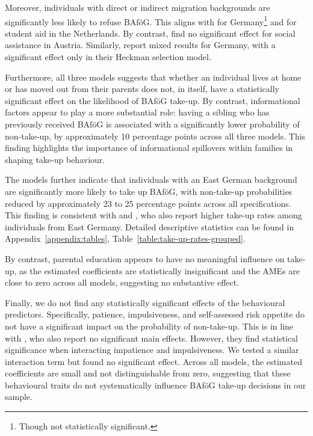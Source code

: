 Moreover, individuals with direct or indirect migration backgrounds are significantly less likely to refuse BAföG. 
This aligns with \cite{herber_non-take-up_2019} for Germany\footnote{Though not statistically significant.} and \cite{konijn_quantifying_2023} for student aid in the Netherlands. 
By contrast, \cite{fuchs_austria_2007} find no significant effect for social assistance in Austria. 
Similarly, \cite{frick_claim_2007} report mixed results for Germany, with a significant effect only in their Heckman selection model.

Furthermore, all three models suggests that whether an individual lives at home or has moved out from their parents does not, in itself, have a statistically significant effect on the likelihood of BAföG take-up. 
By contrast, informational factors appear to play a more substantial role: having a sibling who has previously received BAföG is associated with a significantly lower probability of non-take-up, by approximately 10 percentage points across all three models. 
This finding highlights the importance of informational spillovers within families in shaping take-up behaviour. 

The models further indicate that individuals with an East German background are significantly more likely to take up BAföG, with non-take-up probabilities reduced by approximately 23 to 25 percentage points across all specifications. 
This finding is consistent with \cite{herber_non-take-up_2019} and \cite{harnisch_nontakeup_2019}, who also report higher take-up rates among individuals from East Germany. 
Detailed descriptive statistics can be found in Appendix~\ref{appendix:tables}, Table~\ref{table:take-up-rates-grouped}.

By contrast, parental education appears to have no meaningful influence on take-up, as the estimated coefficients are statistically insignificant and the AMEs are close to zero across all models, suggesting no substantive effect.

Finally, we do not find any statistically significant effects of the behavioural predictors. 
Specifically, patience, impulsiveness, and self-assessed risk appetite do not have a significant impact on the probability of non-take-up. 
This is in line with \cite{herber_non-take-up_2019}, who also report no significant main effects. 
However, they find statistical significance when interacting impatience and impulsiveness. 
We tested a similar interaction term but found no significant effect. 
Across all models, the estimated coefficients are small and not distinguishable from zero, suggesting that these behavioural traits do not systematically influence BAföG take-up decisions in our sample.



